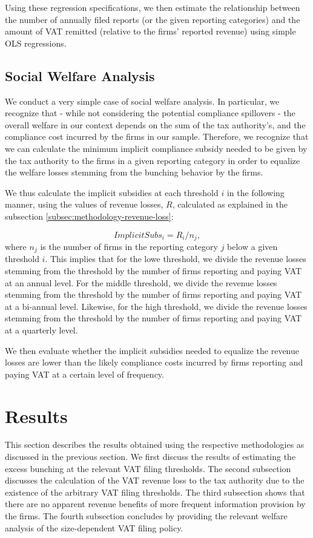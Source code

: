 Using these regression specifications, we then estimate the relationship
between the number of annually filed reports (or the given reporting
categories) and the amount of VAT remitted (relative to the firms'
reported revenue) using simple OLS regressions.

\subsection{Social Welfare Analysis}
\label{subsec:methodology-welfare-analysis}
We conduct a very simple case of social welfare analysis. In particular, we recognize that - while not considering the potential compliance spillovers - the overall welfare in our context depends on the sum of the tax authority's, and the compliance cost incurred by the firms in our sample. Therefore, we recognize that we can calculate the minimum implicit compliance subsidy needed to be given by the tax authority to the firms in a given reporting category in order to equalize the welfare losses stemming from the bunching behavior by the firms.

We thus calculate the implicit subsidies at each threshold $i$ in the following manner, using the values of revenue losses, $R$, calculated as explained in the subsection \ref{subsec:methodology-revenue-loss}:

\begin{equation}
ImplicitSubs_i = R_i / n_j,
\end{equation}
where $n_j$ is the number of firms in the reporting category $j$ below a given threshold $i$. This implies that for the lowe threshold, we divide the revenue losses stemming from the threshold by the number of firms reporting and paying VAT at an annual level. For the middle threshold, we divide the revenue losses stemming from the threshold by the number of firms reporting and paying VAT at a bi-annual level. Likewise, for the high threshold, we divide the revenue losses stemming from the threshold by the number of firms reporting and paying VAT at a quarterly level. 

We then evaluate whether the implicit subsidies needed to equalize the revenue losses are lower than the likely compliance costs incurred by firms reporting and paying VAT at a certain level of frequency.

\section{Results}
\label{sec:3-results}
This section describes the results obtained using the respective methodologies
as discussed in the previous section. We first discuss the results
of estimating the excess bunching at the relevant VAT filing thresholds.
The second subsection discusses the calculation of the VAT revenue
loss to the tax authority due to the existence of the arbitrary VAT
filing thresholds. The third subsection shows that there are no apparent
revenue benefits of more frequent information provision by the firms.
The fourth subsection concludes by providing the relevant welfare
analysis of the size-dependent VAT filing policy.

